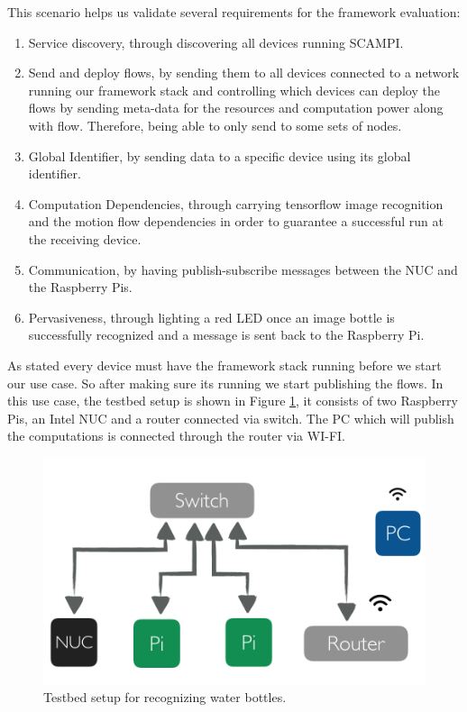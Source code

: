 This scenario helps us validate several requirements for the framework evaluation: 
\begin{enumerate}
	
	\item Service discovery, through discovering all devices running SCAMPI.
	\item Send and deploy flows, by sending them to all devices connected to a network  running our framework stack and controlling which devices can deploy the flows by sending meta-data for the resources and computation power along with flow. Therefore, being able to only send to some sets of nodes.
	\item Global Identifier, by sending data  to a  specific device using its global identifier.

	\item Computation Dependencies, through carrying tensorflow image recognition and the motion flow dependencies in order to guarantee a successful run at the receiving device.

	\item Communication, by having publish-subscribe messages between the NUC and the Raspberry Pis.
	
	
	\item Pervasiveness, through lighting a red LED once an image bottle is successfully recognized and a message is sent back to the Raspberry Pi.

\end{enumerate}

\noindent As stated every device must have the framework stack running before we start our use case. So after making sure its running we start publishing the flows. In this use case, the testbed setup is shown in Figure \ref{fig:tb-tensor}, it consists of two Raspberry Pis, an Intel NUC and a router connected via switch. The PC which will publish the computations is connected through the router via WI-FI. 
 \begin{figure}[H]
	\centering
	\includegraphics[scale=0.6]{images/tb-tensor.png}
	\caption{Testbed setup for recognizing water bottles.}
	\label{fig:tb-tensor}
\end{figure} 




